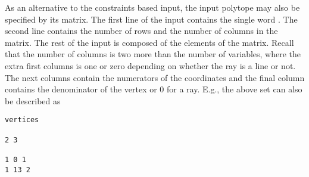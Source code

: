 As an alternative to the constraints based input, the input polytope
may also be specified by its  matrix.
The first line of the input contains the single word .
The second line contains the number of rows
and the number of columns in the  matrix.
The rest of the input is composed of the elements of the matrix.
Recall that the number of columns is two more than the number
of variables, where the extra first columns is one or zero
depending on whether the ray is a line or not.
The next columns contain
the numerators of the coordinates and the final column contains
the denominator of the vertex or $0$ for a ray.
E.g., the above set can also be described as
\begin{verbatim}
vertices

2 3

1 0 1
1 13 2
\end{verbatim}

\subsection{\texorpdfstring{\protect{}}
{barvinok\_enumerate}}

